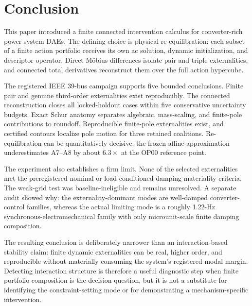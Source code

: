 \section{Conclusion}

This paper introduced a finite connected intervention calculus for
converter-rich power-system DAEs. The defining choice is physical
re-equilibration: each subset of a finite action portfolio receives its own ac
solution, dynamic initialization, and descriptor operator. Direct M\"obius
differences isolate pair and triple externalities, and connected total
derivatives reconstruct them over the full action hypercube.

The registered IEEE 39-bus campaign supports five bounded conclusions.
Finite pair and genuine third-order externalities exist reproducibly. The
connected reconstruction closes all locked-holdout cases within five
conservative uncertainty budgets. Exact Schur anatomy separates algebraic,
mass-scaling, and finite-pole contributions to roundoff. Reproducible
finite-pole externalities exist, and certified contours localize pole motion
for three retained coalitions. Re-equilibration can be quantitatively
decisive: the frozen-affine approximation underestimates A7--A8 by about
$6.3\times$ at the OP00 reference point.

The experiment also establishes a firm limit. None of the selected
externalities met the preregistered nominal or load-conditioned damping
materiality criteria. The weak-grid test was baseline-ineligible and remains
unresolved. A separate audit showed why: the externality-dominant modes are
well-damped converter-control families, whereas the actual limiting mode is a
roughly 1.22-Hz synchronous-electromechanical family with only microunit-scale
finite damping composition.

The resulting conclusion is deliberately narrower than an interaction-based
stability claim: finite dynamic externalities can be real, higher order, and
reproducible without materially consuming the system's registered modal
margin. Detecting interaction structure is therefore a useful diagnostic step
when finite portfolio composition is the decision question, but it is not a
substitute for identifying
the constraint-setting mode or for demonstrating a mechanism-specific
intervention.
